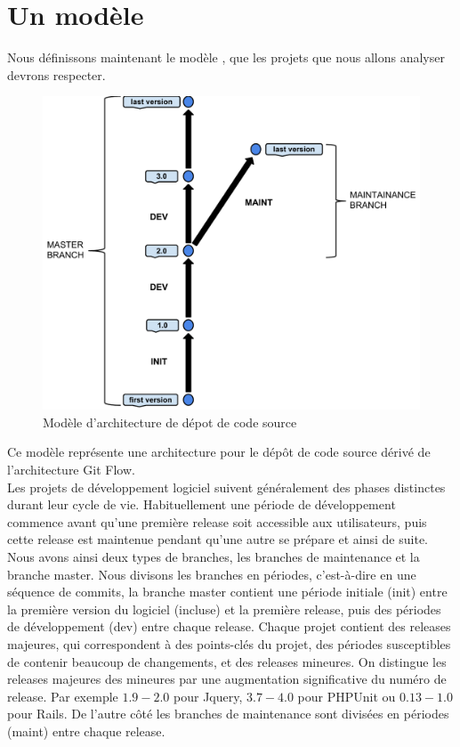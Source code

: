 \section{Un modèle}
\label{sec:model}

Nous définissons maintenant le modèle , que les projets que nous allons analyser devrons respecter.\\

\begin{figure}[t]
  \centering
  \includegraphics[scale=0.5]{data/figures/periods.pdf}
	\caption{Modèle d'architecture de dépot de code source}
	\label{fig:model}
\end{figure}

Ce modèle représente une architecture pour le dépôt de code source dérivé de l'architecture Git Flow.\\
Les projets de développement logiciel suivent généralement des phases distinctes durant leur cycle de vie. Habituellement une période de développement commence avant qu'une première release soit accessible aux utilisateurs, puis cette release est maintenue pendant qu'une autre se prépare et ainsi de suite.\\
Nous avons ainsi deux types de branches, les branches de maintenance et la branche master. Nous divisons les branches en périodes, c'est-à-dire en une séquence de commits, la branche master contient une période initiale (init) entre la première version du logiciel (incluse) et la première release, puis des périodes de développement (dev) entre chaque release. Chaque projet contient des releases majeures, qui correspondent à des points-clés du projet, des périodes susceptibles de contenir beaucoup de changements, et des releases mineures. On distingue les releases majeures des mineures par une augmentation significative du numéro de release. Par exemple $1.9-2.0$ pour Jquery, $3.7-4.0$ pour PHPUnit ou $0.13-1.0$ pour Rails. De l'autre côté les branches de maintenance sont divisées en périodes (maint) entre chaque release.\\
 
